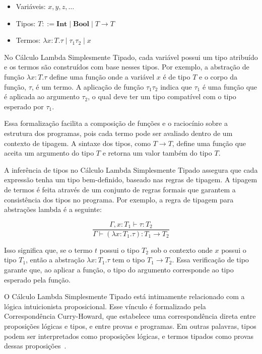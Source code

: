 \begin{itemize}
  \item Variáveis: $x, y, z, \ldots$
  \item Tipos: $T ::= \mathbf{Int} \mid \mathbf{Bool} \mid T \to T$
  \item Termos: $\lambda x:T. \tau \mid \tau_1 \tau_2 \mid x$
\end{itemize}

No Cálculo Lambda Simplesmente Tipado, cada variável possui um tipo atribuído e os termos são construídos com base nesses tipos.
Por exemplo, a abstração de função $\lambda x:T. \tau$ define uma função onde a variável $x$ é de tipo $T$ e o corpo da função, $\tau$, é um termo.
A aplicação de função $\tau_1 \tau_2$ indica que $\tau_1$ é uma função que é aplicada ao argumento $\tau_2$, o qual deve ter um tipo compatível com o tipo esperado por $\tau_1$.

Essa formalização facilita a composição de funções e o raciocínio sobre a estrutura dos programas, pois cada termo pode ser avaliado dentro de um contexto de tipagem.
A sintaxe dos tipos, como $T \to T$, define uma função que aceita um argumento do tipo $T$ e retorna um valor também do tipo $T$.

A inferência de tipos no Cálculo Lambda Simplesmente Tipado assegura que cada expressão tenha um tipo bem-definido, baseado nas regras de tipagem.
A tipagem de termos é feita através de um conjunto de regras formais que garantem a consistência dos tipos no programa.
Por exemplo, a regra de tipagem para abstrações lambda é a seguinte:

\[
  \frac{\Gamma, x:T_1 \vdash \tau:T_2}{\Gamma \vdash (\lambda x:T_1. \tau): T_1 \to T_2}
\]

Isso significa que, se o termo $t$ possui o tipo $T_2$ sob o contexto onde $x$ possui o tipo $T_1$, então a abstração $\lambda x:T_1. \tau$ tem o tipo $T_1 \to T_2$.
Essa verificação de tipo garante que, ao aplicar a função, o tipo do argumento corresponde ao tipo esperado pela função.

O Cálculo Lambda Simplesmente Tipado está intimamente relacionado com a lógica intuicionista proposicional.
Esse vínculo é formalizado pela Correspondência Curry-Howard, que estabelece uma correspondência direta entre proposições lógicas e tipos, e entre provas e programas.
Em outras palavras, tipos podem ser interpretados como proposições lógicas, e termos tipados como provas dessas proposições~\cite{PIERCE2002}.

